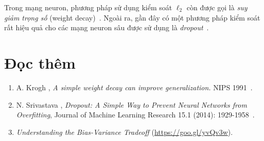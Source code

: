  
 


     
Trong mạng neuron, phương pháp sử dụng kiểm soát $\ell_2$ còn được gọi là \textit{suy giảm trọng số} (weight decay)~\cite{krogh1992simple}. Ngoài ra, gần đây có một phương pháp kiểm soát rất hiệu quả cho các mạng neuron sâu được sử dụng là \textit{dropout}~\cite{srivastava2014dropout}.

\section{Đọc thêm}
\begin{enumerate}
    \item A. Krogh \etal, \textit{A simple weight decay can improve generalization.} NIPS 1991~\cite{krogh1992simple}.

    \item N. Srivastava \etal, \textit{Dropout: A Simple Way to Prevent Neural
    Networks from  Overfitting}, Journal of Machine Learning Research 15.1
    (2014): 1929-1958~\cite{srivastava2014dropout}.

    \item \textit{Understanding the Bias-Variance Tradeoff} (\url{https://goo.gl/yvQv3w}).
 
\end{enumerate}

